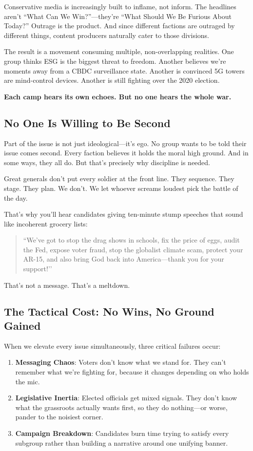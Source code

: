Conservative media is increasingly built to inflame, not inform. The headlines aren’t “What Can We Win?”—they’re “What Should We Be Furious About Today?” Outrage is the product. And since different factions are outraged by different things, content producers naturally cater to those divisions.

The result is a movement consuming multiple, non-overlapping realities. One group thinks ESG is the biggest threat to freedom. Another believes we’re moments away from a CBDC surveillance state. Another is convinced 5G towers are mind-control devices. Another is still fighting over the 2020 election.  

\textbf{Each camp hears its own echoes. But no one hears the whole war.}

\subsection*{No One Is Willing to Be Second}

Part of the issue is not just ideological—it’s ego. No group wants to be told their issue comes second. Every faction believes it holds the moral high ground. And in some ways, they all do. But that’s precisely why discipline is needed.

Great generals don’t put every soldier at the front line. They sequence. They stage. They plan. We don’t. We let whoever screams loudest pick the battle of the day.

That’s why you’ll hear candidates giving ten-minute stump speeches that sound like incoherent grocery lists:
\vspace{1em}
\begin{quote}
    ``We’ve got to stop the drag shows in schools, fix the price of eggs, audit the Fed, expose voter fraud, stop the globalist climate scam, protect your AR-15, and also bring God back into America—thank you for your support!’'
\end{quote}
\vspace{1em}

That’s not a message. That’s a meltdown.

\subsection*{The Tactical Cost: No Wins, No Ground Gained}

When we elevate every issue simultaneously, three critical failures occur:
\begin{enumerate}
    \item \textbf{Messaging Chaos}: Voters don’t know what we stand for. They can’t remember what we’re fighting for, because it changes depending on who holds the mic.
    \item \textbf{Legislative Inertia}: Elected officials get mixed signals. They don’t know what the grassroots actually wants first, so they do nothing—or worse, pander to the noisiest corner.
    \item \textbf{Campaign Breakdown}: Candidates burn time trying to satisfy every subgroup rather than building a narrative around one unifying banner.
\end{enumerate}

